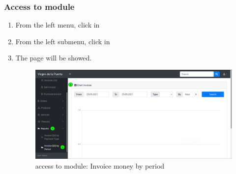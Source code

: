 \documentclass[a4paper,11pt]{refart}
\begin{document}
\subsubsection{Access to module}
\begin{enumerate}
	\item From the left menu, click in  
	\item From the left submenu, click in 
	\item The page will be showed.
	\begin{figure}[H]\centering
		\includegraphics[width=\textwidth]{images/report_invoice_by_period-access.png}
		\caption{access to module: Invoice money by period}
		\label{fig:report_invoice_by_period-access}
	\end{figure}
\end{enumerate}
\end{document}
